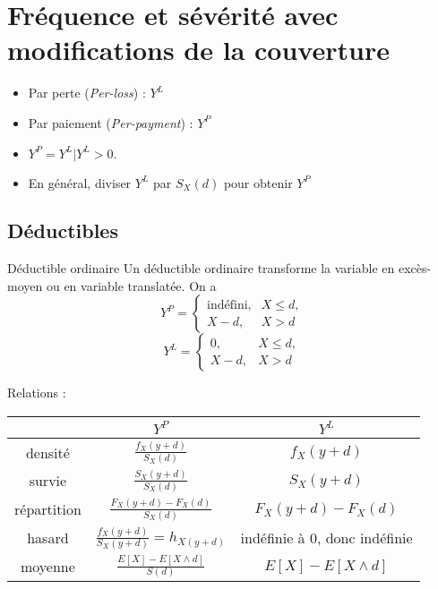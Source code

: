 \chapter{Fréquence et sévérité avec modifications de la couverture}

\begin{itemize}
	\item Par perte (\textit{Per-loss}) : $Y^L$
	\item Par paiement (\textit{Per-payment}) : $Y^P$
	\item $Y^P = Y^L \vert Y^L > 0.$
	\item En général, diviser $Y^L$ par $S_X(d)$ pour obtenir $Y^P$
\end{itemize}

\section{Déductibles}

\begin{definition}{Déductible ordinaire}{}
	Un déductible ordinaire transforme la variable en excès-moyen ou en variable translatée. On a 
	$$Y^P = \begin{cases}
	\text{indéfini},& X\leq d,\\
	X - d,& X > d
	\end{cases}$$
	$$Y^L = \begin{cases}
	0,& X\leq d,\\
	X - d,& X > d
	\end{cases}$$
\end{definition}

Relations : 

\begin{center}
	\begin{tabular}{ccc}
		\hline
		&                              $Y^P$                               &                  $Y^L$                  \\ \hline
		densité   &          $\displaystyle \frac{f_{X}(y + d)}{S_{X}(d)}$           &      $\displaystyle f_{X}(y + d)$       \\
		survie    &          $\displaystyle \frac{S_{X}(y + d)}{S_{X}(d)}$           &      $\displaystyle S_{X}(y + d)$       \\
		répartition &     $\displaystyle \frac{F_{X}(y + d) - F_{X}(d)}{S_{X}(d)}$     & $\displaystyle F_{X}(y + d) - F_{X}(d)$ \\
		hasard    & $\displaystyle \frac{f_{X}(y + d)}{S_{X}(y + d)} = h_{X(y + d)}$ &      indéfinie à 0, donc indéfinie      \\
		moyenne   &        $\displaystyle \frac{E[X] - E[X \wedge d]}{S(d)}$         &  $\displaystyle E[X] - E[X \wedge d]$   \\ \hline
	\end{tabular}
\end{center}

